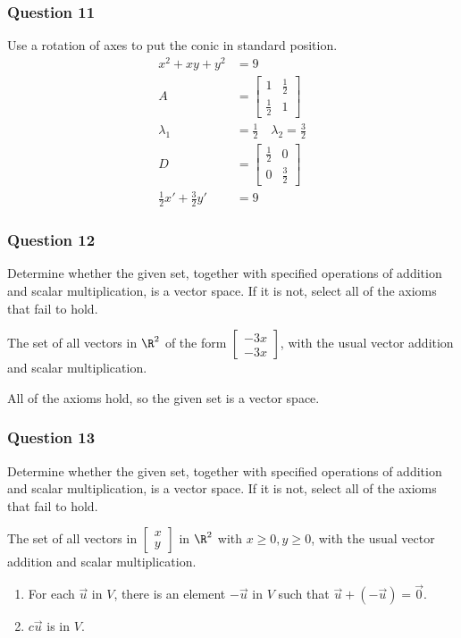 \documentclass{math}
\begin{document}
\subsubsection*{Question 11}
Use a rotation of axes to put the conic in standard position.
\begin{align*}
  x^2+xy+y^2 &= 9 \\
  A &= \begin{bmatrix}
    1 & \frac{1}{2} \\
    \frac{1}{2} & 1
  \end{bmatrix} \\
  \lambda_1 &= \frac{1}{2} \quad \lambda_2 = \frac{3}{2} \\
  D &= \begin{bmatrix}\frac{1}{2} & 0 \\ 0 & \frac{3}{2}\end{bmatrix} \\
  \frac{1}{2}x'+\frac{3}{2}y' &= 9
\end{align*}

\subsubsection*{Question 12}
Determine whether the given set, together with specified operations of addition
and scalar multiplication, is a vector space. If it is not, select all of the
axioms that fail to hold. \par
The set of all vectors in \( \R^2 \) of the form \( \begin{bmatrix}-3x \\ -3x
\end{bmatrix} \), with the usual vector addition and scalar multiplication. \par
All of the axioms hold, so the given set is a vector space.

\subsubsection*{Question 13}
Determine whether the given set, together with specified operations of addition
and scalar multiplication, is a vector space. If it is not, select all of the
axioms that fail to hold. \par
The set of all vectors in \( \begin{bmatrix}x \\ y\end{bmatrix} \) in \( \R^2 \)
with \( x\ge0,y\ge0 \), with the usual vector addition and scalar
multiplication. \par
\begin{enumerate}
  \item For each \( \vec{u} \) in \( V \), there is an element \( -\vec{u} \)
    in \( V \) such that \( \vec{u}+(-\vec{u}) = \vec{0} \).
  \item \( c\vec{u} \) is in \( V \).
\end{enumerate}
\end{document}
